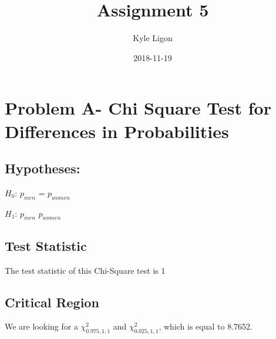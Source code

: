 \documentclass[]{tufte-handout}
\title{Assignment 5}
\author{Kyle Ligon}
\date{2018-11-19}
\newenvironment{Shaded}{}{}
\newcommand{\KeywordTok}[1]{\textcolor[rgb]{0.00,0.44,0.13}{\textbf{#1}}}
\newcommand{\DataTypeTok}[1]{\textcolor[rgb]{0.56,0.13,0.00}{#1}}
\newcommand{\DecValTok}[1]{\textcolor[rgb]{0.25,0.63,0.44}{#1}}
\newcommand{\StringTok}[1]{\textcolor[rgb]{0.25,0.44,0.63}{#1}}
\newcommand{\OtherTok}[1]{\textcolor[rgb]{0.00,0.44,0.13}{#1}}
\newcommand{\OperatorTok}[1]{\textcolor[rgb]{0.40,0.40,0.40}{#1}}
\newcommand{\NormalTok}[1]{#1}
\begin{document}
\maketitle




\section{Problem A- Chi Square Test for Differences in
Probabilities}\label{problem-a--chi-square-test-for-differences-in-probabilities}

\begin{Shaded}
\end{Shaded}

\subsection{Hypotheses:}\label{hypotheses}

\(H_{0}\): \(p_{men}\) = \(p_{women}\)

\(H_{1}\): \(p_{men}\) \neq \(p_{women}\)

\subsection{Test Statistic}\label{test-statistic}

The test statistic of this Chi-Square test is 1

\subsection{Critical Region}\label{critical-region}

We are looking for a \(\chi_{0.975, 1, 1}^2\) and
\(\chi_{0.025, 1, 1}^2\), which is equal to 8.7652.
\end{document}
